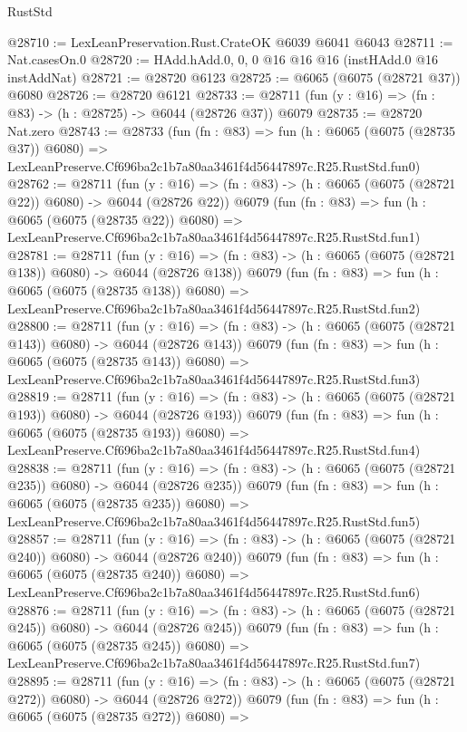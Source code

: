 \begin{lexlean}{RustStd}
\begin{coremodule}
@28710 := LexLeanPreservation.Rust.CrateOK @6039 @6041 @6043
@28711 := Nat.casesOn.{0}
@28720 := HAdd.hAdd.{0, 0, 0} @16 @16 @16 (instHAdd.{0} @16 instAddNat)
@28721 := @28720 @6123
@28725 := @6065 (@6075 (@28721 @37)) @6080
@28726 := @28720 @6121
@28733 := @28711 (fun (y : @16) => (fn : @83) -> (h : @28725) -> @6044 (@28726 @37)) @6079
@28735 := @28720 Nat.zero
@28743 := @28733
    (fun (fn : @83) =>
    fun (h : @6065 (@6075 (@28735 @37)) @6080) =>
    LexLeanPreserve.Cf696ba2c1b7a80aa3461f4d56447897c.R25.RustStd.fun0)
@28762 := @28711
    (fun (y : @16) => (fn : @83) -> (h : @6065 (@6075 (@28721 @22)) @6080) -> @6044 (@28726 @22))
    @6079
    (fun (fn : @83) =>
    fun (h : @6065 (@6075 (@28735 @22)) @6080) =>
    LexLeanPreserve.Cf696ba2c1b7a80aa3461f4d56447897c.R25.RustStd.fun1)
@28781 := @28711
    (fun (y : @16) => (fn : @83) -> (h : @6065 (@6075 (@28721 @138)) @6080) -> @6044 (@28726 @138))
    @6079
    (fun (fn : @83) =>
    fun (h : @6065 (@6075 (@28735 @138)) @6080) =>
    LexLeanPreserve.Cf696ba2c1b7a80aa3461f4d56447897c.R25.RustStd.fun2)
@28800 := @28711
    (fun (y : @16) => (fn : @83) -> (h : @6065 (@6075 (@28721 @143)) @6080) -> @6044 (@28726 @143))
    @6079
    (fun (fn : @83) =>
    fun (h : @6065 (@6075 (@28735 @143)) @6080) =>
    LexLeanPreserve.Cf696ba2c1b7a80aa3461f4d56447897c.R25.RustStd.fun3)
@28819 := @28711
    (fun (y : @16) => (fn : @83) -> (h : @6065 (@6075 (@28721 @193)) @6080) -> @6044 (@28726 @193))
    @6079
    (fun (fn : @83) =>
    fun (h : @6065 (@6075 (@28735 @193)) @6080) =>
    LexLeanPreserve.Cf696ba2c1b7a80aa3461f4d56447897c.R25.RustStd.fun4)
@28838 := @28711
    (fun (y : @16) => (fn : @83) -> (h : @6065 (@6075 (@28721 @235)) @6080) -> @6044 (@28726 @235))
    @6079
    (fun (fn : @83) =>
    fun (h : @6065 (@6075 (@28735 @235)) @6080) =>
    LexLeanPreserve.Cf696ba2c1b7a80aa3461f4d56447897c.R25.RustStd.fun5)
@28857 := @28711
    (fun (y : @16) => (fn : @83) -> (h : @6065 (@6075 (@28721 @240)) @6080) -> @6044 (@28726 @240))
    @6079
    (fun (fn : @83) =>
    fun (h : @6065 (@6075 (@28735 @240)) @6080) =>
    LexLeanPreserve.Cf696ba2c1b7a80aa3461f4d56447897c.R25.RustStd.fun6)
@28876 := @28711
    (fun (y : @16) => (fn : @83) -> (h : @6065 (@6075 (@28721 @245)) @6080) -> @6044 (@28726 @245))
    @6079
    (fun (fn : @83) =>
    fun (h : @6065 (@6075 (@28735 @245)) @6080) =>
    LexLeanPreserve.Cf696ba2c1b7a80aa3461f4d56447897c.R25.RustStd.fun7)
@28895 := @28711
    (fun (y : @16) => (fn : @83) -> (h : @6065 (@6075 (@28721 @272)) @6080) -> @6044 (@28726 @272))
    @6079
    (fun (fn : @83) =>
    fun (h : @6065 (@6075 (@28735 @272)) @6080) =>

\end{coremodule}
\end{lexlean}
